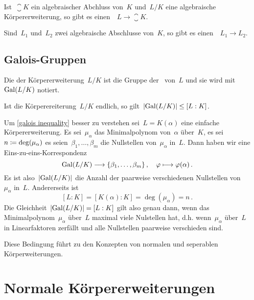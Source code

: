 \begin{corollary}
  Ist~$\closure{K}$ ein algebraischer Abchluss von~$K$ und~$L/K$ eine algebraische Körpererweiterung, so gibt es einen~~$L \to \closure{K}$.
\end{corollary}

\begin{corollary}
  Sind~$L_1$ und~$L_2$ zwei algebraische Abschlusse von~$K$, so gibt es einen~~$L_1 \to L_2$.
\end{corollary}



\subsection{Galois-Gruppen}

\begin{definition}
  Die  der Körpererweiterung~$L/K$ ist die Gruppe der~ von~$L$ und sie wird mit~$\operatorname{Gal}(L/K)$ notiert.
\end{definition}

\begin{proposition}
  \label{galois inequality}
  Ist die Körperereiterung~$L/K$ endlich, so gilt~$\lvert \operatorname{Gal}(L/K) \rvert \leq [L : K]$.
\end{proposition}

Um \cref{galois inequality} besser zu verstehen sei~$L = K(\alpha)$ eine einfache Körpererweiterung.
Es sei~$\mu_\alpha$ das Minimalpolynom von~$\alpha$ über~$K$, es sei~$n \coloneqq \deg(\mu_\alpha)$ es seien~$\beta_1, \dotsc, \beta_m$ die Nullstellen von~$\mu_\alpha$ in~$L$.
Dann haben wir eine Eins-zu-eins-Korrespondenz
\[
  \Gal(L/K)
  \to
  \{ \beta_1, \dotsc, \beta_m \} \,,
  \quad
  \varphi
  \mapsto
  \varphi(\alpha) \,.
\]
Es ist also~$\lvert\operatorname{Gal}(L/K)\rvert$ die Anzahl der paarweise verschiedenen Nullstellen von~$\mu_\alpha$ in~$L$.
Andererseits ist
\[
  [L : K] = [K(\alpha) : K] = \deg(\mu_\alpha) = n \,.
\]
Die Gleichheit~$\lvert\operatorname{Gal}(L/K)\rvert = [L : K]$ gilt also genau dann, wenn das Minimalpolynom~$\mu_\alpha$ über~$L$ maximal viele Nulstellen hat, d.h. wenn~$\mu_\alpha$ über~$L$ in Linearfaktoren zerfällt und alle Nullstellen paarweise verschieden sind.

Diese Bedingung führt zu den Konzepten von normalen und seperablen Körperweiterungen.




\section{Normale Körpererweiterungen}



